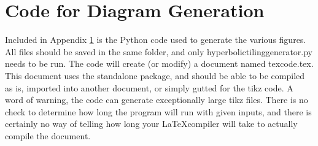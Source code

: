\documentclass[12 pt,oneside]{book}
\begin{document}
\chapter{Code for Diagram Generation}
\label{ch:app}
Included in Appendix \ref{ch:app} is the Python code used to generate the various figures. All files should be saved in the same folder, and only hyperbolictilinggenerator.py needs to be run. The code will create (or modify) a document named texcode.tex. This document uses the standalone package, and should be able to be compiled as is, imported into another document, or simply gutted for the tikz code. A word of warning, the code can generate exceptionally large tikz files. There is no check to determine how long the program will run with given inputs, and there is certainly no way of telling how long your \LaTeX compiler will take to actually compile the document.\\









\end{document}
